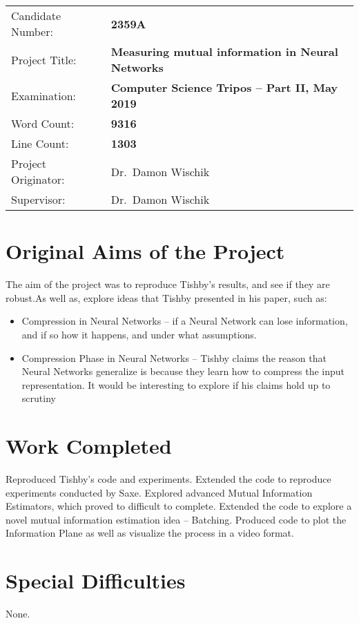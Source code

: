 \documentclass[dissertation.tex]{subfiles}
\begin{document}
{\large
\begin{tabular}{ll}
Candidate Number:   & \bf 2359A                      \\
Project Title:      & \bf Measuring mutual information in Neural Networks \\
Examination:        & \bf Computer Science Tripos -- Part II, May 2019  \\
Word Count:         & \bf 9316\footnotemark[1] \\
Line Count:         & \bf 1303\footnotemark[2] \\
Project Originator: & Dr.\ Damon Wischik                  \\
Supervisor:         & Dr.\ Damon Wischik                  \\ 
\end{tabular}
}


\section*{Original Aims of the Project}

The aim of the project was to reproduce Tishby's results, and see if they are
robust.As well as, explore ideas that Tishby presented in his paper, such as: 
\begin{itemize}
  \item{
      Compression in Neural Networks -- if a Neural Network can lose
      information, and if so how it happens, and under what assumptions.
    }
  \item{
      Compression Phase in Neural Networks -- Tishby claims the reason that
      Neural Networks generalize is because they learn how to compress the input
      representation. It would be interesting to explore if his claims hold up
      to scrutiny
    }
\end{itemize}

\section*{Work Completed}

Reproduced Tishby's code and experiments. Extended the code to reproduce
experiments conducted by Saxe. Explored advanced Mutual Information Estimators,
which proved to difficult to complete. Extended the code to explore a novel
mutual information estimation idea -- Batching. Produced code to plot the
Information Plane as well as visualize the process in a video format.

\section*{Special Difficulties}

None.

\newpage
\end{document}
